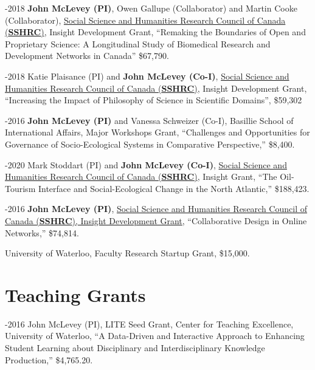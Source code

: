 -2018 \textbf{John McLevey (PI)}, Owen Gallupe (Collaborator)
and Martin Cooke (Collaborator),
\href{http://www.sshrc-crsh.gc.ca/funding-financement/programs-programmes/insight_development_grants-su\%20bventions_de_developpement_savoir-eng.aspx}{Social
Science and Humanities Research Council of Canada (\textbf{SSHRC})},
Insight Development Grant, ``Remaking the Boundaries of Open and
Proprietary Science: A Longitudinal Study of Biomedical Research and
Development Networks in Canada'' \$67,790.

-2018 Katie Plaisance (PI) and \textbf{John McLevey (Co-I)},
\href{http://www.sshrc-crsh.gc.ca/funding-financement/programs-programmes/insight_development_grants-su\%20bventions_de_developpement_savoir-eng.aspx}{Social
Science and Humanities Research Council of Canada (\textbf{SSHRC})},
Insight Development Grant, ``Increasing the Impact of Philosophy of
Science in Scientific Domains'', \$59,302

-2016 \textbf{John McLevey (PI)} and Vanessa Schweizer (Co-I),
Basillie School of International Affairs, Major Workshops Grant,
``Challenges and Opportunities for Governance of Socio-Ecological
Systems in Comparative Perspective,'' \$8,400.

-2020 Mark Stoddart (PI) and \textbf{John McLevey (Co-I)},
\href{http://www.sshrc-crsh.gc.ca/funding-financement/programs-programmes/insight_development_grants-su\%20bventions_de_developpement_savoir-eng.aspx}{Social
Science and Humanities Research Council of Canada (\textbf{SSHRC})},
Insight Grant, ``The Oil-Tourism Interface and Social-Ecological Change
in the North Atlantic,'' \$188,423.

-2016 \textbf{John McLevey (PI)},
\href{http://www.sshrc-crsh.gc.ca/funding-financement/programs-programmes/insight_development_grants-su\%20bventions_de_developpement_savoir-eng.aspx}{Social
Science and Humanities Research Council of Canada (\textbf{SSHRC}),
Insight Development Grant}, ``Collaborative Design in Online Networks,''
\$74,814.

 University of Waterloo, Faculty Research Startup Grant,
\$15,000.

\section{Teaching Grants}\label{teaching-grants}

-2016 John McLevey (PI), LITE Seed Grant, Center for Teaching
Excellence, University of Waterloo, ``A Data-Driven and Interactive
Approach to Enhancing Student Learning about Disciplinary and
Interdisciplinary Knowledge Production,'' \$4,765.20.

